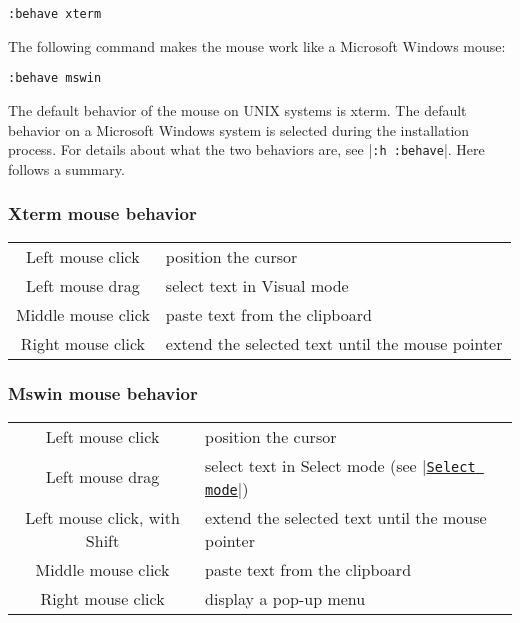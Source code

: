  \begin{Verbatim}[samepage=true]
 :behave xterm
 \end{Verbatim}

The following command makes the mouse work like a Microsoft Windows mouse:

 \begin{Verbatim}[samepage=true]
 :behave mswin
 \end{Verbatim}

The default behavior of the mouse on UNIX systems is xterm.
The default behavior on a Microsoft Windows system is selected during the installation process.
For details about what the two behaviors are, see |\verb!:h :behave!|.
Here follows a summary.
\subsubsection{Xterm mouse behavior}

\begin{center}\begin{longtable}{c l}
				Left mouse click & position the cursor \\
				Left mouse drag & select text in Visual mode \\
				Middle mouse click & paste text from the clipboard \\
				Right mouse click & extend the selected text until the mouse pointer \\
\end{longtable}\end{center}

\subsubsection{Mswin mouse behavior}

\begin{center}\begin{longtable}{c l}
				Left mouse click & position the cursor \\
				Left mouse drag & select text in Select mode (see |\hyperref[Select mode]{\texttt{Select mode}}|) \\
				Left mouse click, with Shift & extend the selected text until the mouse pointer \\
				Middle mouse click & paste text from the clipboard \\
				Right mouse click & display a pop-up menu \\
\end{longtable}\end{center}

